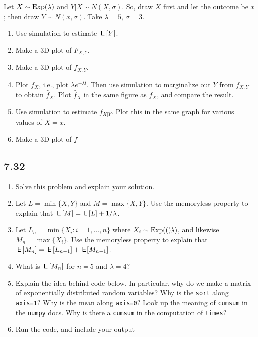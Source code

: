 \documentclass[a4paper]{article}
\begin{document}
\begin{exercise}
Let $X\sim\mathrm{Exp}(\lambda)$ and $Y| X \sim N(X, \sigma)$. So,  draw $X$ first and let the outcome be $x$;  then draw $Y\sim N(x, \sigma)$. Take $\lambda = 5$, $\sigma=3$. 
\begin{enumerate}
\item Use simulation to estimate $\,\mathsf{E}\left[Y\right]$. 
\item Make a 3D plot of $F_{X,Y}$.
\item Make a 3D plot of $f_{X,Y}$.
\item Plot $f_{X}$, i.e., plot $\lambda e^{-\lambda t}$.
  Then use simulation to marginalize out $Y$ from $f_{X,Y}$ to obtain $\hat f_X$.
  Plot $\hat f_X$ in the same figure as $f_X$, and compare the result.
\item Use simulation to estimate $f_{X|Y}$. Plot this in the same graph for various values of $X=x$. 
\item Make a 3D plot of $f$
\end{enumerate}
\end{exercise}





\subsection{7.32}
\label{sec:orga22aa79}

\begin{enumerate}
\item Solve this problem and explain your solution.
\item Let \(L=\min\{X,Y\}\) and \(M=\max\{X,Y\}\). Use the memoryless property to explain that \(\,\mathsf{E}\left[M\right] = \,\mathsf{E}\left[L\right] + 1/\lambda\).
\item Let \(L_{n}=\min\{X_{i} : i = 1,\ldots, n\}\) where \(X_i\sim \mathrm{Exp}(()\lambda)\), and likewise  \(M_{n}=\max\{X_i\}\). Use the memoryless property to explain that \(\,\mathsf{E}\left[M_{n}\right] = \,\mathsf{E}\left[L_{n-1}\right] + \,\mathsf{E}\left[M_{n-1}\right]\).
\item What is \(\,\mathsf{E}\left[M_n\right]\) for \(n=5\) and \(\lambda = 4\)?
\item Explain the idea behind code below. In particular, why do we make a matrix of exponentially distributed random variables? Why is the \texttt{sort} along \texttt{axis=1}? Why is the mean along \texttt{axis=0}? Look up the meaning of \texttt{cumsum} in the \texttt{numpy} docs. Why is there a \texttt{cumsum} in the computation of \texttt{times}?
\item Run the code, and include your output
\end{enumerate}
\end{document}
